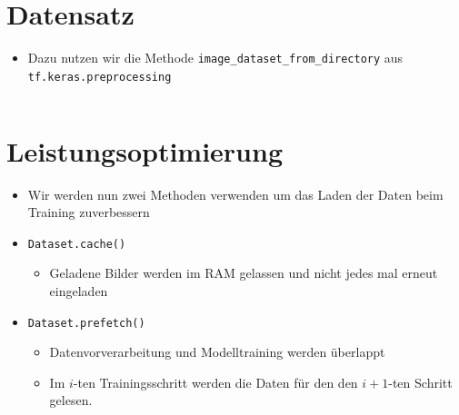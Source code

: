 \documentclass[t]{beamer}
\newcommand\pycode[1]{\inputminted[frame=lines, framesep=2mm, fontsize=\normalsize]{python}{#1}}
\begin{document}
\section{Datensatz}
\begin{frame}
    \begin{itemize}
        \item Dazu nutzen wir die Methode \texttt{image\_dataset\_from\_directory} aus \texttt{tf.keras.preprocessing}
        \pycode{./code-snippets/dataset-from-directory.py}
    \end{itemize}
\end{frame}

\section{Leistungsoptimierung}
\begin{frame}
    \begin{itemize}
        \item Wir werden nun zwei Methoden verwenden um das Laden der Daten beim Training zuverbessern
        \item \texttt{Dataset.cache()}
        \begin{itemize}
            \item Geladene Bilder werden im RAM gelassen und nicht jedes mal erneut eingeladen
        \end{itemize}
        \item \texttt{Dataset.prefetch()}
        \begin{itemize}
            \item Datenvorverarbeitung und Modelltraining werden überlappt
            \item Im \(i\)-ten Trainingsschritt werden die Daten für den den \(i+1\)-ten Schritt gelesen.
        \end{itemize}
    \end{itemize}
\end{frame}
\end{document}
